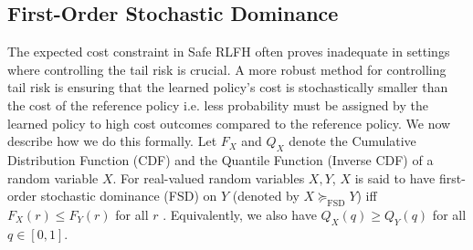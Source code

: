 

\subsection{First-Order Stochastic Dominance}
\label{sec:fosd}

 
The expected cost constraint in Safe RLFH often proves inadequate in settings where controlling the tail risk is crucial. A more robust method for controlling tail risk is ensuring that the learned policy's cost is stochastically smaller than the cost of the reference policy i.e. less probability must be assigned by the learned policy to high cost outcomes compared to the reference policy. We now describe how we do this formally. Let $F_{X}$ and $Q_{X}$ denote the Cumulative Distribution Function (CDF) and the Quantile Function (Inverse CDF) of a random variable $X$.
For real-valued random variables  $X,Y$, $X$ is said to have first-order stochastic dominance (FSD) on $Y$  (denoted by $X \succeq_{\mathrm{FSD}} Y$)  iff  $F_X(r)\le F_Y(r)$  for all  $r$ \citep{dai2023learning}. Equivalently, we also have $Q_X(q)\ge Q_Y(q)$  for all  $q\in[0,1]$.



